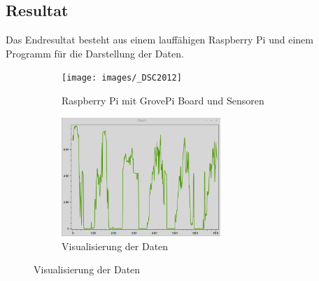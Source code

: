 \subsection*{Resultat}
Das Endresultat besteht aus einem lauffähigen Raspberry Pi und einem Programm für die Darstellung der Daten.
\begin{figure}[htb]
	\begin{subfigure}[b]{0.45\linewidth}
		\centering
		\texttt{[image: images/\_DSC2012]}
		\caption{Raspberry Pi mit GrovePi Board und Sensoren}
	\end{subfigure}
	\begin{subfigure}[b]{.45\linewidth}
		\centering
		\includegraphics[width=6.0cm]{images/resultat}
		\caption{Visualisierung der Daten}
	\end{subfigure}
\end{figure}
